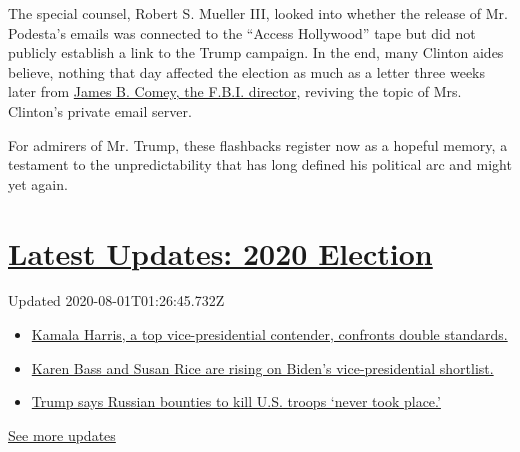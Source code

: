 The special counsel, Robert S. Mueller III, looked into whether the
release of Mr. Podesta's emails was connected to the ``Access
Hollywood'' tape but did not publicly establish a link to the Trump
campaign. In the end, many Clinton aides believe, nothing that day
affected the election as much as a letter three weeks later from
\href{https://www.nytimes.com/2019/10/12/us/politics/james-comey-trump.html}{James
B. Comey, the F.B.I. director}, reviving the topic of Mrs. Clinton's
private email server.

For admirers of Mr. Trump, these flashbacks register now as a hopeful
memory, a testament to the unpredictability that has long defined his
political arc and might yet again.

\hypertarget{latest-updates-2020-election}{%
\section{\texorpdfstring{\href{https://www.nytimes.com/2020/07/31/us/elections/biden-vs-trump.html?action=click\&pgtype=Article\&state=default\&region=MAIN_CONTENT_1\&context=storylines_live_updates}{Latest
Updates: 2020
Election}}{Latest Updates: 2020 Election}}\label{latest-updates-2020-election}}

Updated 2020-08-01T01:26:45.732Z

\begin{itemize}
\tightlist
\item
  \href{https://www.nytimes.com/2020/07/31/us/elections/biden-vs-trump.html?action=click\&pgtype=Article\&state=default\&region=MAIN_CONTENT_1\&context=storylines_live_updates\#link-29fdff45}{Kamala
  Harris, a top vice-presidential contender, confronts double
  standards.}
\item
  \href{https://www.nytimes.com/2020/07/31/us/elections/biden-vs-trump.html?action=click\&pgtype=Article\&state=default\&region=MAIN_CONTENT_1\&context=storylines_live_updates\#link-13ec3d9c}{Karen
  Bass and Susan Rice are rising on Biden's vice-presidential
  shortlist.}
\item
  \href{https://www.nytimes.com/2020/07/31/us/elections/biden-vs-trump.html?action=click\&pgtype=Article\&state=default\&region=MAIN_CONTENT_1\&context=storylines_live_updates\#link-49e9a016}{Trump
  says Russian bounties to kill U.S. troops `never took place.'}
\end{itemize}

\href{https://www.nytimes.com/2020/07/31/us/elections/biden-vs-trump.html?action=click\&pgtype=Article\&state=default\&region=MAIN_CONTENT_1\&context=storylines_live_updates}{See
more updates}

